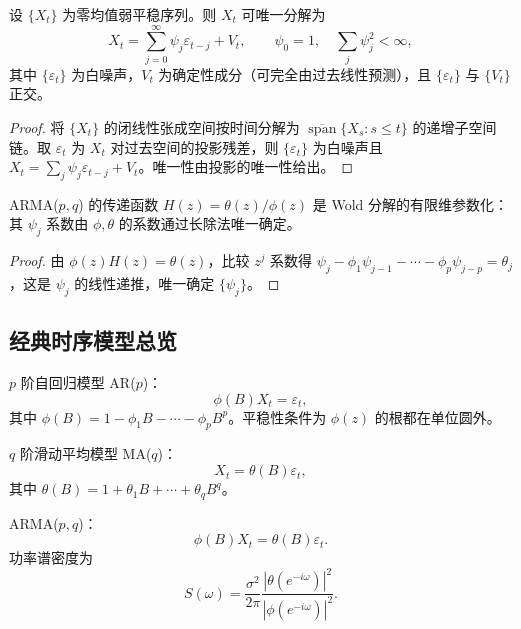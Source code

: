 \begin{theorem}\label{thm:ts_wold}
设 $\{X_t\}$ 为零均值弱平稳序列。则 $X_t$ 可唯一分解为
\[
X_t=\sum_{j=0}^{\infty}\psi_j\varepsilon_{t-j}+V_t,\qquad \psi_0=1,\quad\sum_j\psi_j^2<\infty,
\]
其中 $\{\varepsilon_t\}$ 为白噪声，$V_t$ 为确定性成分（可完全由过去线性预测），且 $\{\varepsilon_t\}$ 与 $\{V_t\}$ 正交。
\end{theorem}

\begin{proof}
将 $\{X_t\}$ 的闭线性张成空间按时间分解为 $\overline{\operatorname{span}}\{X_s:s\le t\}$ 的递增子空间链。取 $\varepsilon_t$ 为 $X_t$ 对过去空间的投影残差，则 $\{\varepsilon_t\}$ 为白噪声且 $X_t=\sum_j\psi_j\varepsilon_{t-j}+V_t$。唯一性由投影的唯一性给出。
\end{proof}

\begin{corollary}\label{cor:ts_arma_wold}
ARMA($p,q$) 的传递函数 $H(z)=\theta(z)/\phi(z)$ 是 Wold 分解的有限维参数化：其 $\psi_j$ 系数由 $\phi,\theta$ 的系数通过长除法唯一确定。
\end{corollary}

\begin{proof}
由 $\phi(z)H(z)=\theta(z)$，比较 $z^j$ 系数得 $\psi_j-\phi_1\psi_{j-1}-\cdots-\phi_p\psi_{j-p}=\theta_j$，这是 $\psi_j$ 的线性递推，唯一确定 $\{\psi_j\}$。
\end{proof}

\subsection{经典时序模型总览}

\begin{definition}[AR 模型]\label{def:ts_ar}
$p$ 阶自回归模型 AR($p$)：
\[
\phi(B) X_t = \varepsilon_t,
\]
其中 $\phi(B) = 1 - \phi_1 B - \cdots - \phi_p B^p$。平稳性条件为 $\phi(z)$ 的根都在单位圆外。
\end{definition}

\begin{definition}[MA 模型]\label{def:ts_ma}
$q$ 阶滑动平均模型 MA($q$)：
\[
X_t = \theta(B)\varepsilon_t,
\]
其中 $\theta(B) = 1 + \theta_1 B + \cdots + \theta_q B^q$。
\end{definition}

\begin{definition}[ARMA 模型]\label{def:ts_arma}
ARMA($p,q$)：
\[
\phi(B) X_t = \theta(B)\varepsilon_t.
\]
功率谱密度为
\[
S(\omega) = \frac{\sigma^2}{2\pi}\frac{|\theta(e^{-i\omega})|^2}{|\phi(e^{-i\omega})|^2}.
\]
\end{definition}

